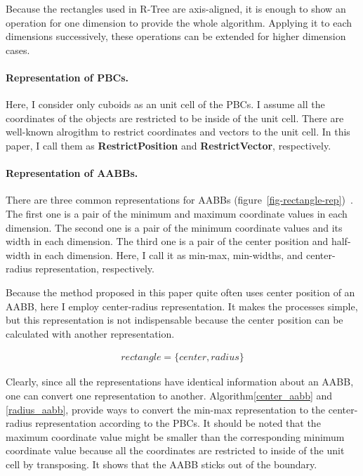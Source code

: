 \documentclass[10pt,letterpaper,twocolumn]{article}
\begin{document}
Because the rectangles used in R-Tree are axis-aligned, it is enough to show an
operation for one dimension to provide the whole algorithm.
Applying it to each dimensions successively, these operations can be extended
for higher dimension cases.

\paragraph{Representation of PBCs.}
Here, I consider only cuboids as an unit cell of the PBCs. I assume all the
coordinates of the objects are restricted to be inside of the unit cell.
There are well-known alrogithm to restrict coordinates and vectors to the unit
cell. In this paper, I call them as \textbf{RestrictPosition} and
\textbf{RestrictVector}, respectively.

\paragraph{Representation of AABBs.}
There are three common representations for AABBs
(figure~\ref{fig-rectangle-rep})~\cite{real-time-collision-detection}.
The first one is a pair of the minimum and maximum coordinate values
in each dimension.
The second one is a pair of the minimum coordinate values and its width in each
dimension.
The third one is a pair of the center position and half-width in each dimension.
Here, I call it as min-max, min-widths, and center-radius representation,
respectively.

Because the method proposed in this paper quite often uses center position of
an AABB, here I employ center-radius representation. It makes the processes
simple, but this representation is not indispensable because the center position
can be calculated with another representation.

\begin{eqnarray}
    rectangle = \{center, radius\} \nonumber
\end{eqnarray}

Clearly, since all the representations have identical information about an AABB,
one can convert one representation to another. Algorithm\ref{center_aabb} and
\ref{radius_aabb}, provide ways to convert the min-max representation to
the center-radius representation according to the PBCs.
It should be noted that the maximum coordinate value might be smaller than the
corresponding minimum coordinate value because all the coordinates are
restricted to inside of the unit cell by transposing. It shows that the AABB
sticks out of the boundary.
\end{document}
